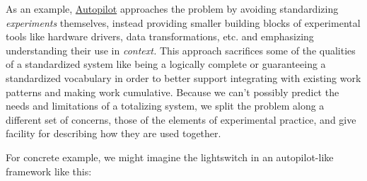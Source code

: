 As an example, \href{https://docs.auto-pi-lot.com}{Autopilot} \citep{saundersAutopilotAutomatingBehavioral2019}  approaches the problem by
avoiding standardizing \emph{experiments} themselves, instead providing
smaller building blocks of experimental tools like hardware drivers,
data transformations, etc. and emphasizing understanding their use in
\emph{context.} This approach sacrifices some of the qualities of a
standardized system like being a logically complete or guaranteeing a
standardized vocabulary in order to better support integrating with
existing work patterns and making work cumulative. Because we can't
possibly predict the needs and limitations of a totalizing system, we
split the problem along a different set of concerns, those of the
elements of experimental practice, and give facility for describing how
they are used together.

For concrete example, we might imagine the lightswitch in an
autopilot-like framework like this:

